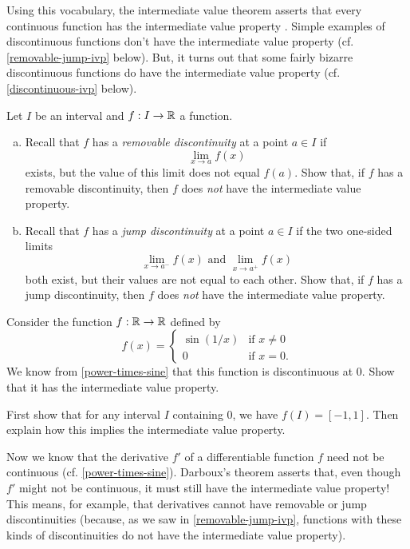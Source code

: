 Using this vocabulary, the intermediate value theorem asserts that every continuous function has the intermediate value property \cite[theorem 3.3]{protter-morrey}. Simple examples of discontinuous functions don't have the intermediate value property (cf. \cref{removable-jump-ivp} below). But, it turns out that some fairly bizarre discontinuous functions do have the intermediate value property (cf. \cref{discontinuous-ivp} below). 

\begin{exercise} \label{removable-jump-ivp}
	Let $I$ be an interval and $f : I \to \mathbb{R}$ a function. 
	\begin{enumerate}[(a)]
		\item Recall that $f$ has a \emph{removable discontinuity} at a point $a \in I$ if
		\[ \lim_{x \to a} f(x) \]
		exists, but the value of this limit does not equal $f(a)$. Show that, if $f$ has a removable discontinuity, then $f$ does \emph{not} have the intermediate value property. 
		
		\item Recall that $f$ has a \emph{jump discontinuity} at a point $a \in I$ if the two one-sided limits
		\[ \lim_{x \to a^-} f(x) \text{ and } \lim_{x \to a^+} f(x) \]
		both exist, but their values are not equal to each other. Show that, if $f$ has a jump discontinuity, then $f$ does \emph{not} have the intermediate value property.  
	\end{enumerate}
\end{exercise}

\begin{exercise} \label{discontinuous-ivp}
	Consider the function $f : \mathbb{R} \to \mathbb{R}$ defined by
	\[ f(x) = \begin{cases} \sin(1/x) & \text{if } x \neq 0 \\ 0 & \text{if } x = 0. \end{cases} \]
	We know from \cref{power-times-sine} that this function is discontinuous at 0. Show that it has the intermediate value property. \begin{hint} First show that for any interval $I$ containing 0, we have $f(I) = [-1,1]$. Then explain how this implies the intermediate value property. 
	\end{hint}
\end{exercise}

Now we know that the derivative $f'$ of a differentiable function $f$ need not be continuous (cf. \cref{power-times-sine}). Darboux's theorem asserts that, even though $f'$ might not be continuous, it must still have the intermediate value property! This means, for example, that derivatives cannot have removable or jump discontinuities (because, as we saw in \cref{removable-jump-ivp}, functions with these kinds of discontinuities do not have the intermediate value property). 

